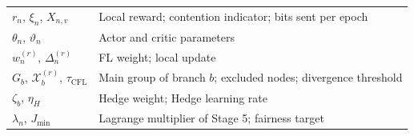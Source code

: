 \begin{EnChapter}
\begin{longtable}{@{}p{}p{}@{}}
$r_n$, $\xi_n$, $X_{n,v}$ & Local reward; contention indicator; bits sent per epoch \\
$\theta_n$, $\vartheta_n$ & Actor and critic parameters \\
$w_n^{(r)}$, $\Delta_n^{(r)}$ & FL weight; local update \\
$G_b$, $\mathcal{X}_b^{(r)}$, $\tau_{\mathrm{CFL}}$ & Main group of branch $b$; excluded nodes; divergence threshold \\
$\zeta_b$, $\eta_H$ & Hedge weight; Hedge learning rate \\
$\lambda_n$, $J_{\min}$ & Lagrange multiplier of Stage 5; fairness target \\
\bottomrule
\end{longtable}

\end{EnChapter}
